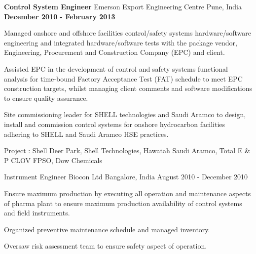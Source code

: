 \begin{cventries}
	\cventry
	{\textbf{Control System Engineer}} %
	{Emerson Export Engineering Centre} %
	{Pune, India} %
	{\textbf{December 2010 - February 2013}} %
	{ %
		\begin{cvitems}
			\item {Managed onshore and offshore facilities control/safety systems hardware/software engineering and integrated hardware/software tests with the package vendor, Engineering, Procurement and Construction Company (EPC) and client.}
			\item {Assisted EPC in the development of control and safety systems functional analysis for time-bound Factory Acceptance Test (FAT) schedule to meet EPC construction targets, whilst managing client comments and software modifications to ensure quality assurance.}
			\item {Site commissioning leader for SHELL technologies and Saudi Aramco to design, install and commission control systems for onshore hydrocarbon facilities adhering to SHELL and Saudi Aramco HSE practices.}
		\end{cvitems}
	}
	\cvprojentry
	{Project : }
	{Shell Deer Park, Shell Technologies, Hawatah Saudi Aramco, Total E \& P CLOV FPSO, Dow Chemicals}
\end{cventries}

\begin{cventries}
	\cventry
	{Instrument Engineer} %
	{Biocon Ltd} %
	{Bangalore, India} %
	{August 2010 - December 2010} %
	{ %
		\begin{cvitems}
			\item {Ensure maximum production by executing all operation and maintenance aspects of pharma plant to ensure maximum production availability of control systems and field instruments. }
			\item {Organized preventive maintenance schedule and managed inventory. }
			\item {Oversaw risk assessment team to ensure safety aspect of operation.}	
		\end{cvitems}
	}

\end{cventries}

